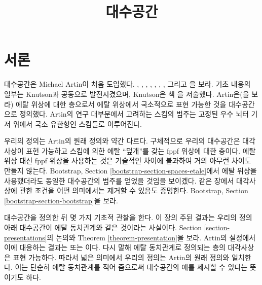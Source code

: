 

%


\title{대수공간}


\maketitle

\label{section-phantom}

\tableofcontents

\section{서론}
\label{section-introduction}

\noindent
대수공간은 Michael Artin이 처음 도입했다.
\cite{ArtinI}, \cite{ArtinII},
\cite{Artin-Theorem-Representability},
\cite{Artin-Construction-Techniques},
\cite{Artin-Algebraic-Spaces},
\cite{Artin-Algebraic-Approximation},
\cite{Artin-Implicit-Function},
그리고 \cite{ArtinVersal}을 보라.
기초 내용의 일부는 Knutson과 공동으로 발전시켰으며,
Knutson은 책 \cite{Kn}을 저술했다.
Artin은(\cite[Definition 1.3]{Artin-Implicit-Function}을 보라)
에탈 위상에 대한 층으로서 에탈 위상에서 국소적으로 표현 가능한 것을
대수공간으로 정의했다. Artin의 연구 대부분에서 고려하는 스킴의 범주는
고정된 우수 뇌터 기저 위에서 국소 유한형인 스킴들로 이루어진다.

\medskip\noindent
우리의 정의는 Artin의 원래 정의와 약간 다르다. 구체적으로 우리의
대수공간은 대각사상이 표현 가능하고 스킴에 의한 에탈 ``덮개''를 갖는
fppf 위상에 대한 층이다. 에탈 위상 대신 fppf 위상을 사용하는 것은
기술적인 차이에 불과하여 거의 아무런 차이도 만들지 않는다.
Bootstrap, Section \ref{bootstrap-section-spaces-etale}에서 에탈 위상을
사용했더라도 동일한 대수공간의 범주를 얻었을 것임을 보이겠다. 같은 장에서
대각사상에 관한 조건을 어떤 의미에서는 제거할 수 있음도 증명한다.
Bootstrap, Section \ref{bootstrap-section-bootstrap}을 보라.

\medskip\noindent
대수공간을 정의한 뒤 몇 가지 기초적 관찰을 한다. 이 장의 주된 결과는
우리의 정의 아래 대수공간이 에탈 동치관계와 같은 것이라는 사실이다.
Section \ref{section-presentations}의 논의와
Theorem \ref{theorem-presentation}을 보라. Artin의 설정에서 이에 대응하는
결과는 \cite[Theorem 1.5]{Artin-Implicit-Function} 또는
\cite[Proposition II.1.7]{Kn}이다. 다시 말해 에탈 동치관계로 정의되는
층의 대각사상은 표현 가능하다. 따라서 넓은 의미에서 우리의 정의는
Artin의 원래 정의와 일치한다. 이는 단순히 에탈 동치관계를 적어 줌으로써
대수공간의 예를 제시할 수 있다는 뜻이기도 하다.


